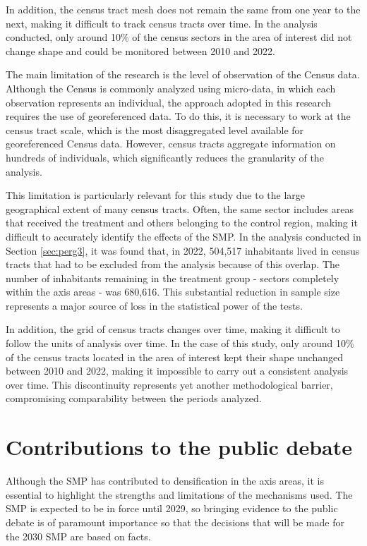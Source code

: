 In addition, the census tract mesh does not remain the same from one year to the next, making it difficult to track census tracts over time. In the analysis conducted, only around 10\% of the census sectors in the area of interest did not change shape and could be monitored between 2010 and 2022.

The main limitation of the research is the level of observation of the Census data. Although the Census is commonly analyzed using micro-data, in which each observation represents an individual, the approach adopted in this research requires the use of georeferenced data. To do this, it is necessary to work at the census tract scale, which is the most disaggregated level available for georeferenced Census data. However, census tracts aggregate information on hundreds of individuals, which significantly reduces the granularity of the analysis.

This limitation is particularly relevant for this study due to the large geographical extent of many census tracts. Often, the same sector includes areas that received the treatment and others belonging to the control region, making it difficult to accurately identify the effects of the SMP. In the analysis conducted in Section \ref{sec:perg3}, it was found that, in 2022, 504,517 inhabitants lived in census tracts that had to be excluded from the analysis because of this overlap. The number of inhabitants remaining in the treatment group - sectors completely within the axis areas - was 680,616. This substantial reduction in sample size represents a major source of loss in the statistical power of the tests.

In addition, the grid of census tracts changes over time, making it difficult to follow the units of analysis over time. In the case of this study, only around 10\% of the census tracts located in the area of interest kept their shape unchanged between 2010 and 2022, making it impossible to carry out a consistent analysis over time. This discontinuity represents yet another methodological barrier, compromising comparability between the periods analyzed.


\section{Contributions to the public debate}
\label{sec:contributions}

Although the SMP has contributed to densification in the axis areas, it is essential to highlight the strengths and limitations of the mechanisms used. The SMP is expected to be in force until 2029, so bringing evidence to the public debate is of paramount importance so that the decisions that will be made for the 2030 SMP are based on facts.

